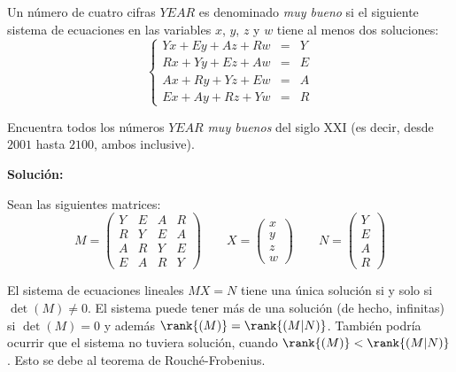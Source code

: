 \documentclass[../../main.tex]{subfiles}
\begin{document}
  \begin{shaded}
    Un número de cuatro cifras $YEAR$ es denominado \textit{muy bueno} si el siguiente sistema de ecuaciones en las variables $x$, $y$, $z$ y $w$ tiene al menos dos soluciones:
    $$
    \left \{
      \begin{matrix}
        Y x + E y + A z + R w & = & Y \\
        R x + Y y + E z + A w & = & E \\
        A x + R y + Y z + E w & = & A \\
        E x + A y + R z + Y w & = & R
      \end{matrix}
    \right .
    $$

    Encuentra todos los números $YEAR$ \textit{muy buenos} del siglo XXI (es decir, desde $2001$ hasta $2100$, ambos inclusive).
  \end{shaded}

  \textbf{Solución:}

  Sean las siguientes matrices:
  $$
  M = \left(
    \begin{matrix}
      Y & E & A & R \\
      R & Y & E & A \\
      A & R & Y & E \\
      E & A & R & Y
    \end{matrix}
  \right) \quad\quad X =
  \left(
    \begin{matrix}
      x \\
      y \\
      z \\
      w
    \end{matrix}
  \right) \quad\quad N =
  \left(
    \begin{matrix}
      Y \\
      E \\
      A \\
      R
    \end{matrix}
  \right)
  $$

  El sistema de ecuaciones lineales $M X = N$ tiene una única solución si y solo si $\det{(M)} \ne 0$. El sistema puede tener más de una solución (de hecho, infinitas) si $\det{(M)} = 0$ y además $\rank{(M)} = \rank{(M | N)}$. También podría ocurrir que el sistema no tuviera solución, cuando $\rank{(M)} < \rank{(M | N)}$. Esto se debe al teorema de Rouché-Frobenius.
\end{document}
